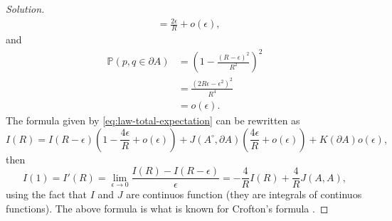 \documentclass[a4paper,10pt, notitlepage]{report}
\newcommand{\pr}{\mathbb{P}}
\begin{document}
\begin{enumerate}
\begin{proof}[Solution]
\begin{align*}
        &= \frac{2\epsilon}{R} + o(\epsilon),
    \end{align*}
    and 
    \begin{align*}
        \pr(p,q \in \partial A) &= \left(1 - \frac{(R-\epsilon)^2}{R^2}\right)^2 \\
        &= \frac{(2R\epsilon - \epsilon^2)^2}{R^4} \\ 
        &=o(\epsilon).
    \end{align*}
    The formula given by \eqref{eq:law-total-expectation} can be rewritten as 
    \begin{equation*}
        I(R) = I(R - \epsilon)\left(1 - \frac{4\epsilon}{R} + o(\epsilon)\right) + J(A^{\circ}, \partial A)\left(\frac{4\epsilon}{R} + o(\epsilon)\right) + K(\partial A)o(\epsilon),
    \end{equation*} 
    then 
    $$
    I(1) = I'(R) = \lim_{\epsilon \to 0} \frac{I(R) - I(R-\epsilon)}{\epsilon} = -\frac{4}{R}I(R) + \frac{4}{R}J(A,A),
    $$
    using the fact that $I$ and $J$ are continuos function (they are integrals
    of continuos functions). The above formula is what is known for Crofton's
    formula \cite[p. 100]{solomon1978geometric}. 
    

\end{proof}
\end{enumerate}
\end{document}
